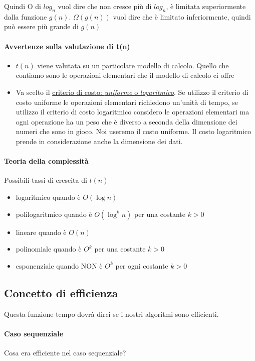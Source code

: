 Quindi O di $log_n$ vuol dire che non cresce più di $log_n$, è limitata superiormente dalla funzione $g(n)$. $\Omega(g(n))$ vuol dire che è limitato inferiormente, quindi può essere più grande di $g(n)$

\paragraph{Avvertenze sulla valutazione di t(n)}
\begin{itemize}
    \item $t(n)$ viene valutata su un particolare modello di calcolo. Quello che contiamo sono le operazioni elementari che il modello di calcolo ci offre
    \item Va scelto il \uline{criterio di costo: \textit{uniforme} o \textit{logaritmico}}. Se utilizzo il criterio di costo uniforme le operazioni elementari richiedono un'unità di tempo, se utilizzo il criterio di costo logaritmico considero le operazioni elementari ma ogni operazione ha un peso che è diverso a seconda della dimensione dei numeri che sono in gioco. Noi useremo il costo uniforme. Il costo logaritmico prende in considerazione anche la dimensione dei dati.
\end{itemize}

\paragraph{Teoria della complessità}
Possibili tassi di crescita di $t(n)$
\begin{itemize}
    \item logaritmico quando è $O(\log n)$
    \item polilogaritmico quando è $O(\log^k n)$ per una costante $k > 0$
    \item lineare quando è $O(n)$
    \item polinomiale quando è $O^k$ per una costante $k > 0$
    \item esponenziale quando NON è $O^k$ per ogni costante $k > 0$
\end{itemize}

\subsection{Concetto di efficienza}
Questa funzione tempo dovrà dirci se i nostri algoritmi sono efficienti.

\paragraph{Caso sequenziale}
Cosa era efficiente nel caso sequenziale? 

